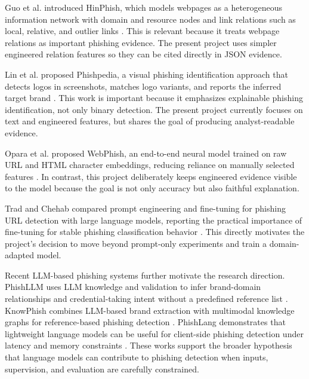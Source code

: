 \documentclass[12pt,letterpaper]{article}
\begin{document}
Guo et al. introduced HinPhish, which models webpages as a heterogeneous information network with domain and resource nodes and link relations such as local, relative, and outlier links \cite{guo2021}. This is relevant because it treats webpage relations as important phishing evidence. The present project uses simpler engineered relation features so they can be cited directly in JSON evidence.

Lin et al. proposed Phishpedia, a visual phishing identification approach that detects logos in screenshots, matches logo variants, and reports the inferred target brand \cite{lin2021}. This work is important because it emphasizes explainable phishing identification, not only binary detection. The present project currently focuses on text and engineered features, but shares the goal of producing analyst-readable evidence.

Opara et al. proposed WebPhish, an end-to-end neural model trained on raw URL and HTML character embeddings, reducing reliance on manually selected features \cite{opara2020}. In contrast, this project deliberately keeps engineered evidence visible to the model because the goal is not only accuracy but also faithful explanation.

Trad and Chehab compared prompt engineering and fine-tuning for phishing URL detection with large language models, reporting the practical importance of fine-tuning for stable phishing classification behavior \cite{trad2024}. This directly motivates the project's decision to move beyond prompt-only experiments and train a domain-adapted model.

Recent LLM-based phishing systems further motivate the research direction. PhishLLM uses LLM knowledge and validation to infer brand-domain relationships and credential-taking intent without a predefined reference list \cite{phishllm2024}. KnowPhish combines LLM-based brand extraction with multimodal knowledge graphs for reference-based phishing detection \cite{knowphish2024}. PhishLang demonstrates that lightweight language models can be useful for client-side phishing detection under latency and memory constraints \cite{phishlang2024}. These works support the broader hypothesis that language models can contribute to phishing detection when inputs, supervision, and evaluation are carefully constrained.
\end{document}

